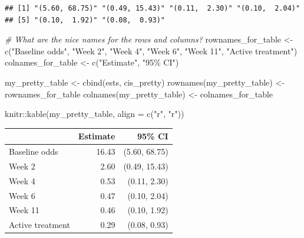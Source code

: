 \documentclass[
  openany]{book}
\newenvironment{Shaded}{\begin{snugshade}}{\end{snugshade}}
\newcommand{\AttributeTok}[1]{\textcolor[rgb]{0.77,0.63,0.00}{#1}}
\newcommand{\CommentTok}[1]{\textcolor[rgb]{0.56,0.35,0.01}{\textit{#1}}}
\newcommand{\FunctionTok}[1]{\textcolor[rgb]{0.00,0.00,0.00}{#1}}
\newcommand{\NormalTok}[1]{#1}
\newcommand{\OtherTok}[1]{\textcolor[rgb]{0.56,0.35,0.01}{#1}}
\newcommand{\SpecialCharTok}[1]{\textcolor[rgb]{0.00,0.00,0.00}{#1}}
\newcommand{\StringTok}[1]{\textcolor[rgb]{0.31,0.60,0.02}{#1}}
\begin{document}
\begin{verbatim}
## [1] "(5.60, 68.75)" "(0.49, 15.43)" "(0.11,  2.30)" "(0.10,  2.04)"
## [5] "(0.10,  1.92)" "(0.08,  0.93)"
\end{verbatim}

\begin{Shaded}
\begin{Highlighting}[]
\CommentTok{\# What are the nice names for the rows and columns?}
\NormalTok{rownames\_for\_table }\OtherTok{\textless{}{-}} \FunctionTok{c}\NormalTok{(}\StringTok{"Baseline odds"}\NormalTok{, }\StringTok{"Week 2"}\NormalTok{, }\StringTok{"Week 4"}\NormalTok{, }\StringTok{"Week 6"}\NormalTok{, }\StringTok{"Week 11"}\NormalTok{, }\StringTok{"Active treatment"}\NormalTok{)}
\NormalTok{colnames\_for\_table }\OtherTok{\textless{}{-}} \FunctionTok{c}\NormalTok{(}\StringTok{"Estimate"}\NormalTok{, }\StringTok{"95\% CI"}\NormalTok{)}

\NormalTok{my\_pretty\_table }\OtherTok{\textless{}{-}} \FunctionTok{cbind}\NormalTok{(ests, cis\_pretty)}
\FunctionTok{rownames}\NormalTok{(my\_pretty\_table) }\OtherTok{\textless{}{-}}\NormalTok{ rownames\_for\_table}
\FunctionTok{colnames}\NormalTok{(my\_pretty\_table) }\OtherTok{\textless{}{-}}\NormalTok{ colnames\_for\_table}
\end{Highlighting}
\end{Shaded}

\begin{Shaded}
\begin{Highlighting}[]
\NormalTok{knitr}\SpecialCharTok{::}\FunctionTok{kable}\NormalTok{(my\_pretty\_table, }\AttributeTok{align =} \FunctionTok{c}\NormalTok{(}\StringTok{"r"}\NormalTok{, }\StringTok{"r"}\NormalTok{))}
\end{Highlighting}
\end{Shaded}

\begin{tabular}{l|r|r}
\hline
  & Estimate & 95\% CI\\
\hline
Baseline odds & 16.43 & (5.60, 68.75)\\
\hline
Week 2 & 2.60 & (0.49, 15.43)\\
\hline
Week 4 & 0.53 & (0.11,  2.30)\\
\hline
Week 6 & 0.47 & (0.10,  2.04)\\
\hline
Week 11 & 0.46 & (0.10,  1.92)\\
\hline
Active treatment & 0.29 & (0.08,  0.93)\\
\hline
\end{tabular}
\end{document}
